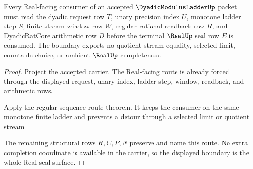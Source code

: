 \begin{theorem}
\label{thm:dyadic-modulus-ladder-real-seal-boundary}
Every Real-facing consumer of an accepted $\DyadicModulusLadderUp$ packet must read the dyadic request row $T$, unary precision index $U$, monotone ladder step $S$, finite stream-window row $W$, regular rational readback row $R$, and DyadicRatCore arithmetic row $D$ before the terminal $\RealUp$ seal row $E$ is consumed. The boundary exports no quotient-stream equality, selected limit, countable choice, or ambient $\RealUp$ completeness.
\end{theorem}
\begin{proof}
Project the accepted carrier. The Real-facing route is already forced through the displayed request, unary index, ladder step, window, readback, and arithmetic rows.

Apply the regular-sequence route theorem. It keeps the consumer on the same monotone finite ladder and prevents a detour through a selected limit or quotient stream.

The remaining structural rows $H,C,P,N$ preserve and name this route. No extra completion coordinate is available in the carrier, so the displayed boundary is the whole Real seal surface.
\end{proof}




